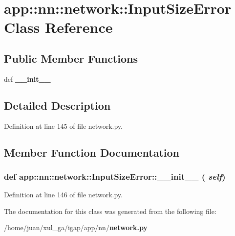 \section{app::nn::network::InputSizeError Class Reference}
\label{classapp_1_1nn_1_1network_1_1InputSizeError}
\subsection*{Public Member Functions}
\begin{CompactItemize}
\item 
def {\bf \_\-\_\-init\_\-\_\-}
\end{CompactItemize}


\subsection{Detailed Description}


Definition at line 145 of file network.py.

\subsection{Member Function Documentation}
\subsubsection{\setlength{\rightskip}{0pt plus 5cm}def app::nn::network::InputSizeError::\_\-\_\-init\_\-\_\- ( {\em self})}\label{classapp_1_1nn_1_1network_1_1InputSizeError_43d5b82575b70ccdf02a4baaf96f6fa1}




Definition at line 146 of file network.py.

The documentation for this class was generated from the following file:\begin{CompactItemize}
\item 
/home/juan/xul\_\-ga/igap/app/nn/{\bf network.py}\end{CompactItemize}
